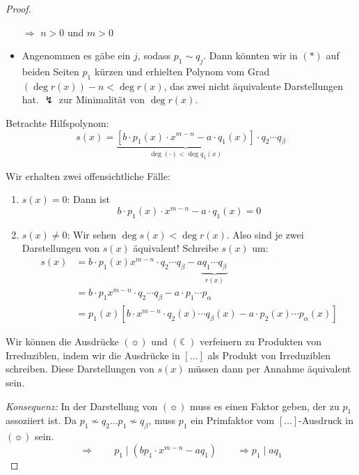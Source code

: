 \documentclass[a4paper,12pt,numbers=noenddot,parskip=full]{scrartcl}
\theoremstyle{dotless}
\theoremstyle{remark}
\begin{document}
\begin{proof}
\begin{itemize}
			$\Rightarrow$ $n > 0$ und $m > 0$
			
			\item Angenommen es gäbe ein $j$, sodass $p_1 \sim q_j$. Dann könnten wir in $(*)$ auf beiden Seiten $p_1$ kürzen und erhielten Polynom vom Grad $(\deg r(x)) - n < \deg r(x)$, das zwei nicht äquivalente Darstellungen hat. $\lightning$ zur Minimalität von $\deg r(x)$.
		\end{itemize}
	
		Betrachte Hilfspolynom:
		\begin{equation*}
			s(x) = \underbrace{\left[ b \cdot p_1(x) \cdot x^{m-n} - a \cdot q_1(x) \right]}_{\deg (\cdot) < \deg q_1(x)} \cdot q_2 \cdots q_\beta \tag{\sun}
		\end{equation*}
		
		Wir erhalten zwei offensichtliche Fälle:
		\begin{enumerate}
			\item $s(x) = 0$: Dann ist
			\begin{equation*}
				b \cdot p_1(x) \cdot x^{m-n} - a \cdot q_1(x) = 0
			\end{equation*}
			\item $s(x) \neq 0$: Wir sehen $\deg s(x) < \deg r(x)$. Also sind je zwei Darstellungen von $s(x)$ äquivalent! Schreibe $s(x)$ um:
			\begin{align*}
				s(x) &= b \cdot p_1(x) x^{m-n} \cdot q_2 \cdots q_\beta - a \underbrace{q_1 \cdots q_\beta}_{r(x)} \\
				&= b \cdot p_1 x ^{m-n} \cdot q_2 \cdots q_\beta - a \cdot p_1 \cdots p_\alpha \\
				&= p_1(x) \left[ b \cdot x^{m-n} \cdot q_2(x) \cdots q_\beta(x) - a \cdot p_2(x) \cdots p_\alpha(x) \right] \tag{\leftmoon}
			\end{align*}
		\end{enumerate}
	
		Wir können die Ausdrücke $(\sun)$ und $(\leftmoon)$ verfeinern zu Produkten von Irreduziblen, indem wir die Ausdrücke in $[\dots]$ als Produkt von Irreduziblen schreiben. Diese Darstellungen von $s(x)$ müssen dann per Annahme äquivalent sein.
		
		\textit{Konsequenz:} In der Darstellung von $(\sun)$ muss es einen Faktor geben, der zu $p_1$ assoziiert ist. Da $p_1 \nsim q_2  \dots p_1 \nsim q_\beta$, muss $p_1$ ein Primfaktor vom $[\dots]$-Ausdruck in $(\sun)$ sein.
		\begin{equation*}
			\Rightarrow \qquad p_1 \mid (b p_1 \cdot x^{m-n} - a q_1) \qquad \Rightarrow p_1 \mid a q_1
		\end{equation*}
		

\end{proof}
\end{document}
